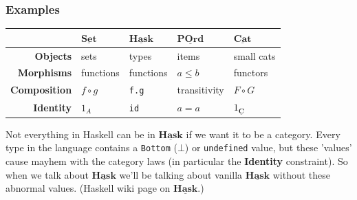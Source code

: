 \documentclass[10pt]{beamer}
\newcommand{\Cat}[1]{\ensuremath{\underline{\mathbf{#1}}}}
\theoremstyle{definition}
\theoremstyle{remark}
\numberwithin{equation}{section}
\begin{document}
\begin{frame}[fragile]
  \frametitle{Examples}

  \begin{center}
    \begin{tabular}{r l l l l}\toprule
    & $\Cat{Set}$ & $\Cat{Hask}$ & $\Cat{POrd}$ & $\Cat{Cat}$ \\\midrule
    \textbf{Objects} & sets & types & items & small cats \\
    \textbf{Morphisms} & functions & functions & $a \leq b$ & functors \\
    \textbf{Composition} & $f \circ g$ & \lstinline!f.g! & transitivity & $F \circ G$ \\
    \textbf{Identity} & $1_A$ & {\lstinline!id!} & $a = a$ & $1_{\Cat{C}}$ \\\bottomrule
  \end{tabular}
  \end{center}

  Not everything in Haskell can be in $\Cat{Hask}$ if we want it to be a category. Every type in the language contains a \lstinline{Bottom} ($\bot$) or \lstinline{undefined} value, but these 'values' cause mayhem with the category laws (in particular the \textbf{Identity} constraint). So when we talk about \Cat{Hask} we'll be talking about vanilla \Cat{Hask} without these abnormal values.
  {\small (Haskell wiki page on \Cat{Hask}.)}
\end{frame}
\end{document}
